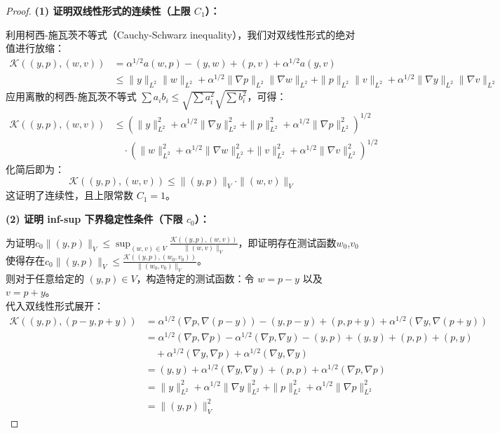 \documentclass[UTF8, 12pt]{ctexart}
\begin{document}
\begin{proof}
\textbf{(1) 证明双线性形式的连续性（上限 $C_1$）：}

利用柯西-施瓦茨不等式（Cauchy-Schwarz inequality），我们对双线性形式的绝对值进行放缩：
\begin{align*}
\mathcal{K}((y,p), (w,v)) 
&=\alpha^{1/2}a(w,p)-(y,w)+(p,v)+\alpha^{1/2}a(y,v)\\
&\le \|y\|_{L^2} \|w\|_{L^2} + \alpha^{1/2}\|\nabla p\|_{L^2} \|\nabla w\|_{L^2} + \|p\|_{L^2} \|v\|_{L^2} + \alpha^{1/2}\|\nabla y\|_{L^2} \|\nabla v\|_{L^2}
\end{align*}
应用离散的柯西-施瓦茨不等式 $\sum a_i b_i \le \sqrt{\sum a_i^2}\sqrt{\sum b_i^2}$，可得：
\begin{align*}
\mathcal{K}((y,p), (w,v)) &\le \left(\|y\|_{L^2}^2 + \alpha^{1/2}\|\nabla y\|_{L^2}^2 + \|p\|_{L^2}^2 + \alpha^{1/2}\|\nabla p\|_{L^2}^2 \right)^{1/2} \\
&\quad \cdot \left(\|w\|_{L^2}^2 + \alpha^{1/2}\|\nabla w\|_{L^2}^2 + \|v\|_{L^2}^2 + \alpha^{1/2}\|\nabla v\|_{L^2}^2 \right)^{1/2}
\end{align*}
化简后即为：
\begin{equation}
\mathcal{K}((y,p), (w,v)) \le \|(y,p)\|_V \cdot \|(w,v)\|_V
\end{equation}
这证明了连续性，且上限常数 $C_1 = 1$。

\medskip
\textbf{(2) 证明 inf-sup 下界稳定性条件（下限 $c_0$）：}

为证明$c_0 \|(y,p)\|_V \le \sup_{(w,v)\in V} \frac{\mathcal{K}((y,p),(w,v))}{\|(w,v)\|_V}$，即证明存在测试函数$w_0$,$v_0$使得存在$c_0 \|(y,p)\|_V \le  \frac{\mathcal{K}((y,p),(w_0,v_0))}{\|(w_0,v_0)\|_V}$。\\
则对于任意给定的 $(y,p) \in V$，构造特定的测试函数：令 $w = p - y$ 以及 $v = p + y$。\\
代入双线性形式展开：
\begin{align*}
\mathcal{K}((y,p), (p-y, p+y)) &= \alpha^{1/2}(\nabla p, \nabla(p-y)) - (y, p-y) + (p, p+y) + \alpha^{1/2}(\nabla y, \nabla(p+y)) \\
&= \alpha^{1/2}(\nabla p, \nabla p) - \alpha^{1/2}(\nabla p, \nabla y) - (y,p) + (y,y) + (p,p) + (p,y) \\
&\quad + \alpha^{1/2}(\nabla y, \nabla p) + \alpha^{1/2}(\nabla y, \nabla y)\\
&=(y,y)+ \alpha^{1/2}(\nabla y, \nabla y) + (p,p)+ \alpha^{1/2}(\nabla p, \nabla p)\\
&=\|y\|_{L^2}^2 + \alpha^{1/2}\|\nabla y\|_{L^2}^2 + \|p\|_{L^2}^2 + \alpha^{1/2}\|\nabla p\|_{L^2}^2 \\
&= \|(y,p)\|_V^2
\end{align*}


\end{proof}
\end{document}

